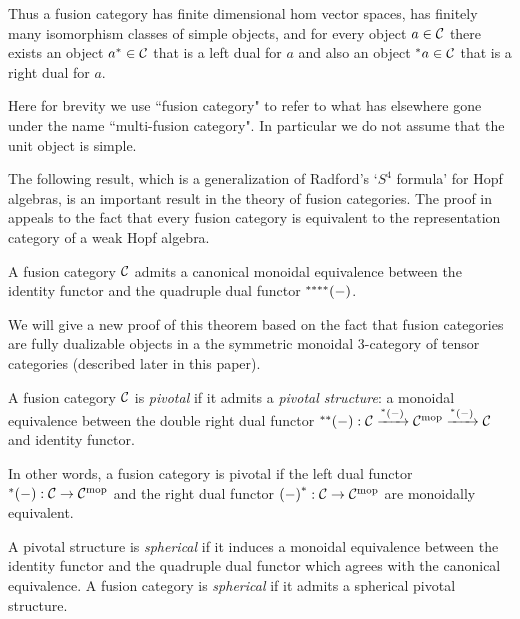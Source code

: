 \documentclass{amsart}
\begin{document}
Thus a fusion category has finite dimensional hom vector spaces, has finitely many isomorphism classes of simple objects, and for every object $a \in \mathcal C$ there exists an object ${a^*} \in \mathcal C$ that is a left dual for $a$ and also an object ${}^{*}a \in \mathcal C$ that is a right dual for $a$.


\begin{warning}
Here for brevity we use ``fusion category" to refer to what has elsewhere gone under the name ``multi-fusion category". In particular we do not assume that the unit object is simple. 
\end{warning}

The following result, which is a generalization of Radford's `$S^4$ formula' for Hopf algebras, is an important result in the theory of fusion categories. The proof in \cite{MR2183279} appeals to the fact that every fusion category is equivalent to the representation category of a weak Hopf algebra.  

\begin{theorem}[\cite{MR2183279}]
	A fusion category $\mathcal C$ admits a canonical monoidal equivalence between the identity functor and the quadruple dual functor ${}^{****}{(-)}$.
\end{theorem}

We will give a new proof of this theorem based on the fact that fusion categories are fully dualizable objects in a the symmetric monoidal 3-category of tensor categories (described later in this paper).

\begin{definition}
A fusion category $\mathcal C$ is \emph{pivotal} if it admits a {\em pivotal structure}: a monoidal equivalence between the double right dual functor ${}^{**}{(-)}: \mathcal C \xrightarrow{{}^*{(-)}} \mathcal C^{\mathrm{mop}} \xrightarrow{{}^*{(-)}} \mathcal C$ and identity functor.
\end{definition}

In other words, a fusion category is pivotal if the left dual functor ${}^*{(-)}: \mathcal C \rightarrow \mathcal C^{\mathrm{mop}}$ and the right dual functor ${(-)}^*: \mathcal C \rightarrow \mathcal C^{\mathrm{mop}}$ are monoidally equivalent.


\begin{definition}
	A pivotal structure is {\em spherical} if it induces a monoidal equivalence between the identity functor and the quadruple dual functor which agrees with the canonical equivalence. A fusion category is {\em spherical} if it admits a spherical pivotal structure.  
\end{definition}
\end{document}

